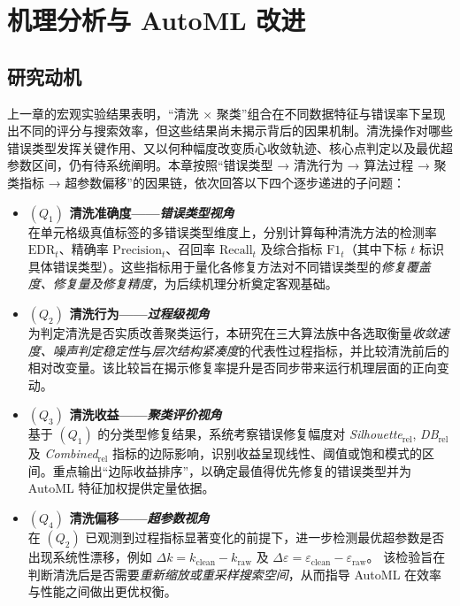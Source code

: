 \documentclass[10pt]{article} %
\numberwithin{equation}{section}
\begin{document}
\section{机理分析与 AutoML 改进}
\label{sec:chapter6}

\subsection{研究动机}
\label{sec:motivation}

\textcolor[rgb]{0.00,0.07,1.00}{上一章的宏观实验结果表明，“清洗 × 聚类”组合在不同数据特征与错误率下呈现出不同的评分与搜索效率，但这些结果尚未揭示背后的因果机制。清洗操作对哪些错误类型发挥关键作用、又以何种幅度改变质心收敛轨迹、核心点判定以及最优超参数区间，仍有待系统阐明。本章按照“错误类型 → 清洗行为 → 算法过程 → 聚类指标 → 超参数偏移”的因果链，依次回答以下四个逐步递进的子问题：}

\begin{itemize}
    \item \textbf{\((Q_1)\) 清洗准确度——\emph{错误类型视角}}\\
          \textcolor[rgb]{0.00,0.07,1.00}{在单元格级真值标签的多错误类型维度上，分别计算每种清洗方法的检测率 \(\mathrm{EDR}_t\)、精确率 \(\mathrm{Precision}_t\)、召回率 \(\mathrm{Recall}_t\) 及综合指标 \(\mathrm{F1}_t\)（其中下标 \(t\) 标识具体错误类型）。这些指标用于量化各修复方法对不同错误类型的\emph{修复覆盖度、修复量及修复精度}，为后续机理分析奠定客观基础。}

    \item \textbf{\((Q_2)\) 清洗行为——\emph{过程级视角}}\\
          \textcolor[rgb]{0.00,0.07,1.00}{为判定清洗是否实质改善聚类运行，本研究在三大算法族中各选取衡量\emph{收敛速度、噪声判定稳定性}与\emph{层次结构紧凑度}的代表性过程指标，并比较清洗前后的相对改变量。该比较旨在揭示修复率提升是否同步带来运行机理层面的正向变动。}

    \item \textbf{\((Q_3)\) 清洗收益——\emph{聚类评价视角}}\\
          \textcolor[rgb]{0.00,0.07,1.00}{基于 \((Q_1)\) 的分类型修复结果，系统考察错误修复幅度对 \emph{Silhouette\(_{\mathrm{rel}}\)}, \emph{DB\(_{\mathrm{rel}}\)} 及 \emph{Combined\(_{\mathrm{rel}}\)} 指标的边际影响，识别收益呈现线性、阈值或饱和模式的区间。重点输出“边际收益排序”，以确定最值得优先修复的错误类型并为 AutoML 特征加权提供定量依据。}

    \item \textbf{\((Q_4)\) 清洗偏移——\emph{超参数视角}}\\
          \textcolor[rgb]{0.00,0.07,1.00}{在 \((Q_2)\) 已观测到过程指标显著变化的前提下，进一步检测最优超参数是否出现系统性漂移，例如  
          \(\Delta k = k_{\mathrm{clean}} - k_{\mathrm{raw}}\) 及  
          \(\Delta\varepsilon = \varepsilon_{\mathrm{clean}} - \varepsilon_{\mathrm{raw}}\)。  
          该检验旨在判断清洗后是否需要\emph{重新缩放或重采样搜索空间}，从而指导 AutoML 在效率与性能之间做出更优权衡。}
\end{itemize}
\end{document}
